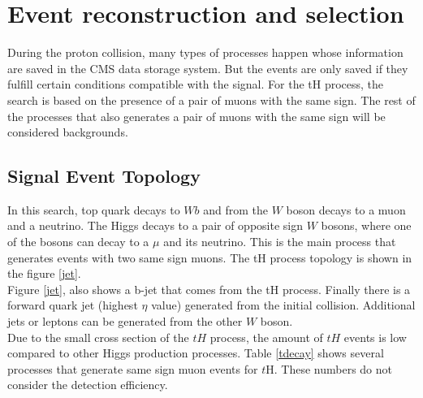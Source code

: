 \chapter{Event reconstruction and selection}
During the proton collision, many types of processes happen whose information are saved in the CMS data storage system. But the events are only saved if they fulfill certain conditions compatible with the signal. 
For the tH process, the search is based on the presence of a pair of muons with the same sign. The rest of the processes that also generates a pair of muons with the same sign will be considered backgrounds. 
\section{Signal Event Topology} 
In this search, top quark decays to $Wb$ and from the $W$ boson decays to a muon and a neutrino. The Higgs decays to a pair of opposite sign $W$ bosons, where one of the bosons can decay to a $\mu$ and its neutrino. This is the main process that generates events with two same sign muons. The tH process topology is shown in the figure \ref{jet}.\\

Figure \ref{jet}, also shows a b-jet that comes from the tH process. Finally there is a forward quark jet (highest $\eta$ value) generated from the initial collision. Additional jets or leptons can be generated from the other $W$ boson.\\
	
Due to the small cross section of the $tH$ process, the amount of $tH$ events is low compared to other Higgs production processes. 
Table \ref{tdecay} shows several processes that generate same sign muon events for $t$H. These numbers do not consider the detection efficiency.


